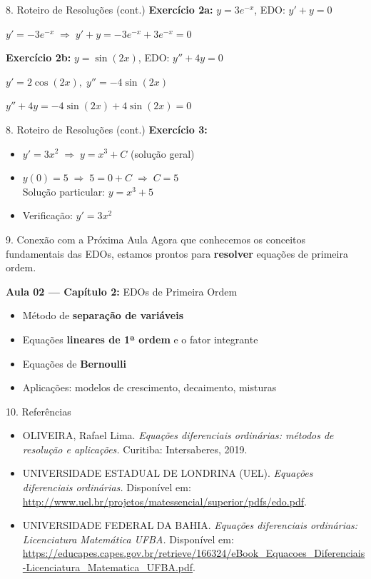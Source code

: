 \documentclass[11pt, aspectratio=169]{beamer}
\begin{document}
\begin{frame}{8. Roteiro de Resoluções (cont.)}
\textbf{Exercício 2a:} $y = 3e^{-x}$, EDO: $y' + y = 0$

$y' = -3e^{-x} \;\Longrightarrow\; y' + y = -3e^{-x} + 3e^{-x} = 0$ \checkmark

\vspace{0.4cm}
\textbf{Exercício 2b:} $y = \sin(2x)$, EDO: $y'' + 4y = 0$

$y' = 2\cos(2x),\; y'' = -4\sin(2x)$

$y'' + 4y = -4\sin(2x) + 4\sin(2x) = 0$ \checkmark
\end{frame}

\begin{frame}{8. Roteiro de Resoluções (cont.)}
\textbf{Exercício 3:}
\begin{itemize}
  \item[a)] $y' = 3x^2 \;\Longrightarrow\; y = x^3 + C$ (solução geral)
  \item[b)] $y(0) = 5 \;\Longrightarrow\; 5 = 0 + C \;\Longrightarrow\; C = 5$ \\
  Solução particular: $y = x^3 + 5$
  \item[c)] Verificação: $y' = 3x^2$ \checkmark
\end{itemize}
\end{frame}

\begin{frame}{9. Conexão com a Próxima Aula}
Agora que conhecemos os conceitos fundamentais das EDOs, estamos prontos para \textbf{resolver} equações de primeira ordem.

\textbf{Aula 02 --- Capítulo 2:} EDOs de Primeira Ordem
\begin{itemize}
  \item Método de \textbf{separação de variáveis}
  \item Equações \textbf{lineares de 1ª ordem} e o fator integrante
  \item Equações de \textbf{Bernoulli}
  \item Aplicações: modelos de crescimento, decaimento, misturas
\end{itemize}
\end{frame}

\begin{frame}{10. Referências}
\small
\begin{itemize}
  \item OLIVEIRA, Rafael Lima. \textit{Equações diferenciais ordinárias: métodos de resolução e aplicações.} Curitiba: Intersaberes, 2019.
  \item UNIVERSIDADE ESTADUAL DE LONDRINA (UEL). \textit{Equações diferenciais ordinárias.} Disponível em: \url{http://www.uel.br/projetos/matessencial/superior/pdfs/edo.pdf}.
  \item UNIVERSIDADE FEDERAL DA BAHIA. \textit{Equações diferenciais ordinárias: Licenciatura Matemática UFBA.} Disponível em: \url{https://educapes.capes.gov.br/retrieve/166324/eBook_Equacoes_Diferenciais-Licenciatura_Matematica_UFBA.pdf}.
\end{itemize}
\end{frame}
\end{document}
